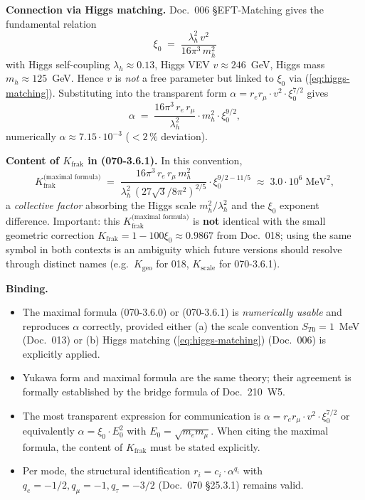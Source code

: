 \textbf{Connection via Higgs matching.}
Doc.~006 §EFT-Matching gives the fundamental relation
\begin{equation}
  \xi_0 \;=\; \frac{\lambda_h^2\, v^2}{16\pi^3\, m_h^2}
  \label{eq:higgs-matching}
\end{equation}
with Higgs self-coupling $\lambda_h \approx 0.13$, Higgs VEV
$v \approx 246$~GeV, Higgs mass $m_h \approx 125$~GeV. Hence $v$ is
\emph{not} a free parameter but linked to $\xi_0$ via
(\ref{eq:higgs-matching}). Substituting into the transparent form
$\alpha = r_e r_\mu \cdot v^2 \cdot \xi_0^{7/2}$ gives
\begin{equation}
  \alpha \;=\;
  \frac{16\pi^3\,r_e\,r_\mu}{\lambda_h^2}
  \cdot m_h^2 \cdot \xi_0^{9/2},
\end{equation}
numerically $\alpha \approx 7.15\cdot 10^{-3}$ ($<2\,\%$ deviation).

\textbf{Content of $K_{\text{frak}}$ in (070-3.6.1).}
In this convention,
\begin{equation}
  K_{\text{frak}}^{\text{(maximal formula)}}
  \;=\;
  \frac{16\pi^3\,r_e\,r_\mu\,m_h^2}{\lambda_h^2\,(27\sqrt{3}/8\pi^2)^{2/5}}
  \cdot \xi_0^{9/2 - 11/5}
  \;\approx\; 3.0 \cdot 10^{6}\;\text{MeV}^2,
\end{equation}
a \emph{collective factor} absorbing the Higgs scale
$m_h^2/\lambda_h^2$ and the $\xi_0$ exponent difference. Important:
this $K_{\text{frak}}^{\text{(maximal formula)}}$ is \textbf{not}
identical with the small geometric correction
$K_{\text{frak}} = 1 - 100\xi_0 \approx 0.9867$ from Doc.~018; using
the same symbol in both contexts is an ambiguity which future
versions should resolve through distinct names (e.g.\
$K_{\text{geo}}$ for 018, $K_{\text{scale}}$ for 070-3.6.1).

\textbf{Binding.}
\begin{itemize}[leftmargin=2em,itemsep=2pt,topsep=2pt]
  \item The maximal formula (070-3.6.0) or (070-3.6.1) is
        \emph{numerically usable} and reproduces $\alpha$ correctly,
        provided either (a) the scale convention $S_{T0} = 1$~MeV
        (Doc.~013) or (b) Higgs matching (\ref{eq:higgs-matching})
        (Doc.~006) is explicitly applied.
  \item Yukawa form and maximal formula are the same theory; their
        agreement is formally established by the bridge formula of
        Doc.~210~W5.
  \item The most transparent expression for communication is
        $\alpha = r_e r_\mu \cdot v^2 \cdot \xi_0^{7/2}$ or
        equivalently $\alpha = \xi_0 \cdot E_0^2$ with
        $E_0 = \sqrt{m_e m_\mu}$. When citing the maximal formula,
        the content of $K_{\text{frak}}$ must be stated explicitly.
  \item Per mode, the structural identification
        $r_i = c_i \cdot \alpha^{q_i}$ with
        $q_e = -1/2, q_\mu = -1, q_\tau = -3/2$ (Doc.~070 §25.3.1)
        remains valid.
\end{itemize}

